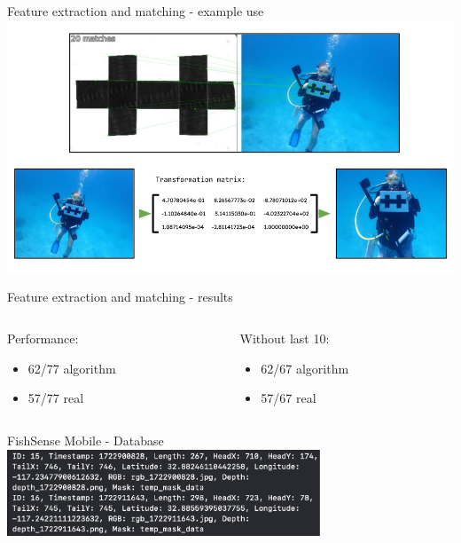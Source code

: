\begin{frame}{Feature extraction and matching - example use}
    \centering
    \includegraphics[height=1.0\textheight,width=1.0\textwidth,keepaspectratio]{images/fs_homography_warped.png}
\end{frame}

\begin{frame}{Feature extraction and matching - results} 
    \begin{columns}
        \begin{column}{0.3\textwidth}
            Performance:
            \begin{itemize}
                \item 62/77 algorithm
                \item 57/77 real
            \end{itemize}
        \end{column}
        \begin{column}{0.3\textwidth}
            Without last 10:
            \begin{itemize}
                \item 62/67 algorithm
                \item 57/67 real
            \end{itemize}
        \end{column}
    \end{columns}
\end{frame}

\begin{frame}{FishSense Mobile - Database}
    \centering
    \includegraphics[height=0.7\textheight,width=0.7\textwidth,keepaspectratio]{images/DBLog.png}
\end{frame}


